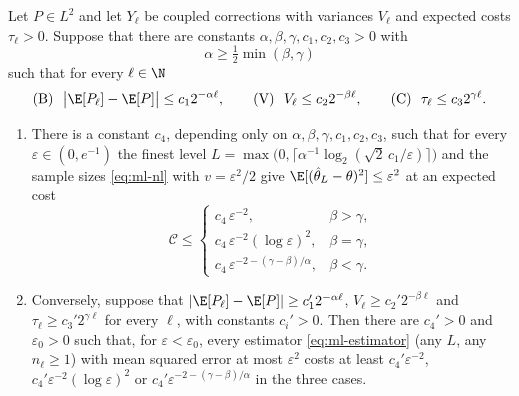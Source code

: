 \begin{theorem}[Giles]\label{thm:ml-complexity}
Let $P\in L^2$ and let $Y_\ell$ be coupled corrections with variances $V_\ell$ and expected costs
$\tau_\ell>0$. Suppose that there are constants $\alpha,\beta,\gamma,c_1,c_2,c_3>0$ with
\[
  \alpha\ge\tfrac12\min(\beta,\gamma)
\]
such that for every $\ell\in\N$
\[
  \text{(B)}\ \ \big|\E[P_\ell]-\E[P]\big|\le c_12^{-\alpha\ell},\qquad
  \text{(V)}\ \ V_\ell\le c_22^{-\beta\ell},\qquad
  \text{(C)}\ \ \tau_\ell\le c_32^{\gamma\ell}.
\]
\begin{enumerate}[label=(\roman*)]
  \item There is a constant $c_4$, depending only on $\alpha,\beta,\gamma,c_1,c_2,c_3$, such that
    for every $\varepsilon\in(0,e^{-1})$ the finest level
    $L=\max\big(0,\big\lceil\alpha^{-1}\log_2(\sqrt2\,c_1/\varepsilon)\big\rceil\big)$ and the
    sample sizes \eqref{eq:ml-nl} with $v=\varepsilon^2/2$ give
    $\E[(\hat\theta_L-\theta)^2]\le\varepsilon^2$ at an expected cost
    \[
      \mathcal C\le\begin{cases}
        c_4\,\varepsilon^{-2}, & \beta>\gamma,\\
        c_4\,\varepsilon^{-2}(\log\varepsilon)^2, & \beta=\gamma,\\
        c_4\,\varepsilon^{-2-(\gamma-\beta)/\alpha}, & \beta<\gamma.
      \end{cases}
    \]
  \item Conversely, suppose that $|\E[P_\ell]-\E[P]|\ge c_1'2^{-\alpha\ell}$,
    $V_\ell\ge c_2'2^{-\beta\ell}$ and $\tau_\ell\ge c_3'2^{\gamma\ell}$ for every $\ell$, with
    constants $c_i'>0$. Then there are $c_4'>0$ and $\varepsilon_0>0$ such that, for
    $\varepsilon<\varepsilon_0$, every estimator \eqref{eq:ml-estimator} (any $L$, any
    $n_\ell\ge1$) with mean squared error at most $\varepsilon^2$ costs at least
    $c_4'\varepsilon^{-2}$, $c_4'\varepsilon^{-2}(\log\varepsilon)^2$ or
    $c_4'\varepsilon^{-2-(\gamma-\beta)/\alpha}$ in the three cases.
\end{enumerate}
\end{theorem}

